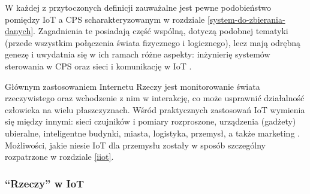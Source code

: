 \documentclass[a4paper, 12pt, twoside]{article}
\begin{document}
W każdej z przytoczonych
definicji zauważalne jest pewne podobieństwo pomiędzy IoT a CPS
scharakteryzowanym w rozdziale \ref{system-do-zbierania-danych}. Zagadnienia te
posiadają część wspólną, dotyczą podobnej tematyki (przede wszystkim połączenia świata fizycznego i logicznego),
lecz mają odrębną genezę i uwydatnia się w ich ramach różne aspekty:
inżynierię systemów sterowania w CPS oraz sieci i komunikację w IoT \cite{cps-vs-iot}.

Głównym zastosowaniem Internetu Rzeczy jest monitorowanie świata rzeczywistego
oraz wchodzenie z nim w interakcję, co może usprawnić działalność człowieka na wielu płaszczyznach.
Wśród praktycznych zastosowań IoT wymienia się między innymi:
sieci czujników i pomiary rozproszone, urządzenia (gadżety) ubieralne,
inteligentne budynki, miasta, logistyka, przemysł, a także marketing \cite{internet-reczy}.
Możliwości, jakie niesie IoT dla przemysłu zostały w sposób szczególny rozpatrzone
w rozdziale \ref{iiot}.

\subsubsection{``Rzeczy'' w IoT}
\end{document}
